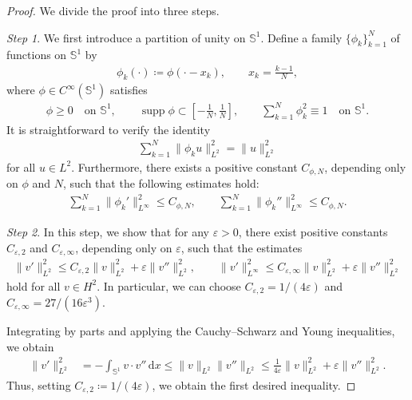 \documentclass{article}
\theoremstyle{remark}
\theoremstyle{definition}
\newcommand{\supp}{\operatorname{supp}}
\numberwithin{equation}{section}
\begin{document}
\begin{proof}
We divide the proof into three steps.

\textit{Step 1}.
We first introduce a partition of unity on $\mathbb{S}^1$.
Define a family $\{\phi_k\}_{k=1}^N$ of functions on $\mathbb{S}^1$ by
\begin{align*}
    \phi_k(\cdot)\coloneqq\phi(\cdot-x_k),\qquad
    x_k=\frac{k-1}{N},
\end{align*}
where $\phi\in C^\infty(\mathbb{S}^1)$ satisfies
\begin{align}
    \phi\ge0\quad\text{on }\mathbb{S}^1,\qquad
    \supp\phi\subset\left[-\frac{1}{N},\frac{1}{N}\right],\qquad
    \sum_{k=1}^N\phi_k^2\equiv1\quad\text{on }\mathbb{S}^1.
    \label{eq:partition-of-unity}
\end{align}
It is straightforward to verify the identity
\begin{align}
    \sum_{k=1}^N\|\phi_k u\|_{L^2}^2 = \|u\|_{L^2}^2
    \label{eq:sum_phi_k-u_L2}
\end{align}
for all $u\in L^2$.
Furthermore, there exists a positive constant $C_{\phi,N}$, depending only on $\phi$ and $N$, such that the following estimates hold:
\begin{align}
    \sum_{k=1}^N\|\phi_k'\|_{L^\infty}^2\le C_{\phi,N},\qquad
    \sum_{k=1}^N\|\phi_k''\|_{L^\infty}^2 \le C_{\phi,N}.
    \label{eq:phi'_phi''_estimate}
\end{align}

\textit{Step 2}.
In this step, we show that for any $\varepsilon>0$, there exist positive constants $C_{\varepsilon,2}$ and $C_{\varepsilon,\infty}$, depending only on $\varepsilon$, such that the estimates
\begin{align}
    \|v'\|_{L^2}^2 \le C_{\varepsilon,2}\|v\|_{L^2}^2 + \varepsilon\|v''\|_{L^2}^2,\qquad
    \|v'\|_{L^\infty}^2 \le C_{\varepsilon,\infty}\|v\|_{L^2}^2 + \varepsilon\|v''\|_{L^2}^2
    \label{eq:v'_L2_Linf}
\end{align}
hold for all $v\in H^2$.
In particular, we can choose $C_{\varepsilon,2}=1/(4\varepsilon)$ and $C_{\varepsilon,\infty}=27/(16\varepsilon^3)$.

Integrating by parts and applying the Cauchy--Schwarz and Young inequalities, we obtain
\begin{align}
    \|v'\|_{L^2}^2
    &=-\int_{\mathbb{S}^1}v\cdot v''\,\mathrm{d}x
    \le\|v\|_{L^2}\|v''\|_{L^2}
    \le\frac{1}{4\varepsilon}\|v\|_{L^2}^2 + \varepsilon\|v''\|_{L^2}^2.
    \label{eq:first_ineq}
\end{align}
Thus, setting $C_{\varepsilon,2}\coloneqq1/(4\varepsilon)$, we obtain the first desired inequality.


\end{proof}
\end{document}
